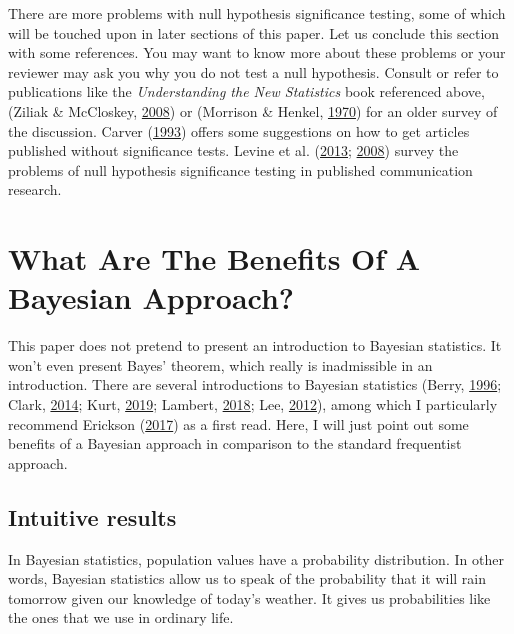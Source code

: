 \documentclass[doc]{apa6}
\begin{document}
There are more problems with null hypothesis significance testing, some
of which will be touched upon in later sections of this paper. Let us
conclude this section with some references. You may want to know more
about these problems or your reviewer may ask you why you do not test a
null hypothesis. Consult or refer to publications like the
\emph{Understanding the New Statistics} book referenced above, (Ziliak
\& McCloskey,
\protect\hyperlink{ref-ziliakCultStatisticalSignificance2008}{2008}) or
(Morrison \& Henkel,
\protect\hyperlink{ref-morrisonSignificanceTestControversy1970}{1970})
for an older survey of the discussion. Carver
(\protect\hyperlink{ref-carverCaseStatisticalSignificance1993}{1993})
offers some suggestions on how to get articles published without
significance tests. Levine et al.
(\protect\hyperlink{ref-LevineQuantitativeCommunicationResearch2013}{2013};
\protect\hyperlink{ref-LevineCriticalAssessmentNull2008}{2008}) survey
the problems of null hypothesis significance testing in published
communication research.

\section{What Are The Benefits Of A Bayesian
Approach?}\label{what-are-the-benefits-of-a-bayesian-approach}

This paper does not pretend to present an introduction to Bayesian
statistics. It won't even present Bayes' theorem, which really is
inadmissible in an introduction. There are several introductions to
Bayesian statistics (Berry,
\protect\hyperlink{ref-BerryStatisticsBayesianPerspective1996}{1996};
Clark, \protect\hyperlink{ref-ClarkBayesianBasicsConceptual2014}{2014};
Kurt, \protect\hyperlink{ref-kurtBayesianStatisticsFun2019}{2019};
Lambert, \protect\hyperlink{ref-lambertStudentsGuideBayesian2018}{2018};
Lee,
\protect\hyperlink{ref-leeBayesianStatisticsIntroduction2012}{2012}),
among which I particularly recommend Erickson
(\protect\hyperlink{ref-EricksonBeginningBayes2017}{2017}) as a first
read. Here, I will just point out some benefits of a Bayesian approach
in comparison to the standard frequentist approach.

\subsection{Intuitive results}\label{intuitive-results}

In Bayesian statistics, population values have a probability
distribution. In other words, Bayesian statistics allow us to speak of
the probability that it will rain tomorrow given our knowledge of
today's weather. It gives us probabilities like the ones that we use in
ordinary life.
\end{document}
